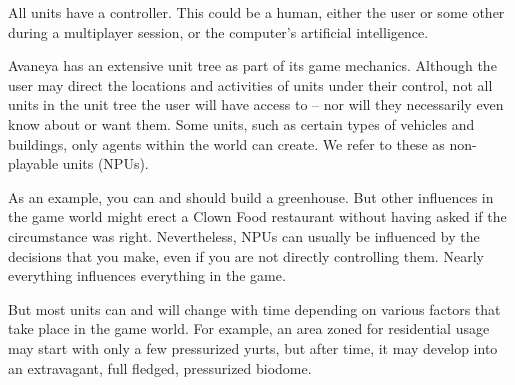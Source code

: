 

All units have a controller. This could be a human, either the user or some other during a multiplayer session, or the computer's artificial intelligence.

Avaneya has an extensive unit tree as part of its game mechanics. Although the user may direct the locations and activities of units under their control, not all units in the unit tree the user will have access to -- nor will they necessarily even know about or want them. Some units, such as certain types of vehicles and buildings, only agents within the world can create. We refer to these as non-playable units (NPUs).

As an example, you can and should build a greenhouse. But other influences in the game world might erect a Clown Food restaurant without having asked if the circumstance was right. Nevertheless, NPUs can usually be influenced by the decisions that you make, even if you are not directly controlling them. Nearly everything influences everything in the game.

But most units can and will change with time depending on various factors that take place in the game world. For example, an area zoned for residential usage may start with only a few pressurized yurts, but after time, it may develop into an extravagant, full fledged, pressurized biodome.

